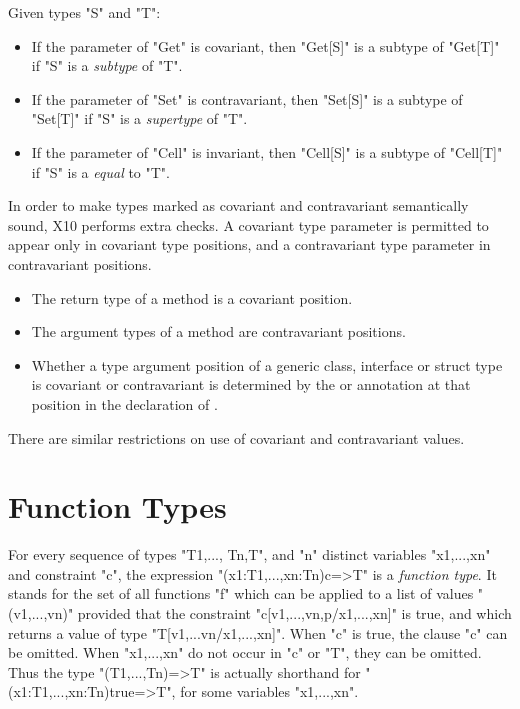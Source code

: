 Given types \xcd"S" and \xcd"T": 
\begin{itemize}
\item
If the parameter of \xcd"Get" is covariant, then
\xcd"Get[S]" is a subtype of \xcd"Get[T]" if
\xcd"S" is a {\em subtype} of \xcd"T".

\item
If the parameter of \xcd"Set" is contravariant, then
\xcd"Set[S]" is a subtype of \xcd"Set[T]" if
\xcd"S" is a {\em supertype} of \xcd"T".

\item
If the parameter of \xcd"Cell" is invariant, then
\xcd"Cell[S]" is a subtype of \xcd"Cell[T]" if
\xcd"S" is a {\em equal} to \xcd"T".
\end{itemize}


In order to make types marked as covariant and contravariant semantically
sound, X10 performs extra checks.  
A covariant type parameter is permitted to appear only in covariant type positions,
and a contravariant type parameter in contravariant positions. 
\begin{itemize}
\item The return type of a method is a covariant position.
\item The argument types of a method are contravariant positions.
\item Whether a type argument position of a generic class, interface or struct type 
is covariant or contravariant is determined by the \Xcd{+} or \Xcd{-} annotation
at that position in the declaration of .
\end{itemize}

There are similar restrictions on use of covariant and contravariant values. 



\section{Function Types}

For every sequence of types \xcd"T1,..., Tn,T", and \xcd"n" distinct variables
\xcd"x1,...,xn" and constraint \xcd"c", the expression
\xcd"(x1:T1,...,xn:Tn){c}=>T" is a \emph{function type}. It stands for
 the set of all functions \xcd"f" which can be applied to a
 list of values \xcd"(v1,...,vn)" provided that the constraint
 \xcd"c[v1,...,vn,p/x1,...,xn]" is true, and which returns a value of
 type \xcd"T[v1,...vn/x1,...,xn]". When \xcd"c" is true, the clause \xcd"{c}" can be
 omitted. When \xcd"x1,...,xn" do not occur in \xcd"c" or \xcd"T", they can be
 omitted. Thus the type \xcd"(T1,...,Tn)=>T" is actually shorthand for
 \xcd"(x1:T1,...,xn:Tn){true}=>T", for some variables \xcd"x1,...,xn".

